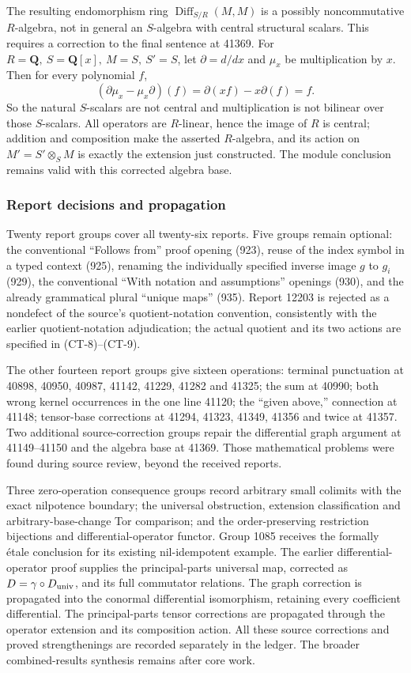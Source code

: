 The resulting endomorphism ring \(\operatorname{Diff}_{S/R}(M,M)\) is a possibly noncommutative \(R\)-algebra, not in general an \(S\)-algebra with central structural scalars. This requires a correction to the final sentence at 41369. For \(R=\mathbf Q,\ S=\mathbf Q[x],\ M=S,\ S'=S\), let \(\partial=d/dx\) and \(\mu_x\) be multiplication by \(x\). Then for every polynomial \(f\), \[
(\partial\mu_x-\mu_x\partial)(f)
 =\partial(xf)-x\partial(f)=f.
\] So the natural \(S\)-scalars are not central and multiplication is not bilinear over those \(S\)-scalars. All operators are \(R\)-linear, hence the image of \(R\) is central; addition and composition make the asserted \(R\)-algebra, and its action on \(M'=S'\otimes_SM\) is exactly the extension just constructed. The module conclusion remains valid with this corrected algebra base.

\subsubsection{Report decisions and propagation}\label{report-decisions-and-propagation}

Twenty report groups cover all twenty-six reports. Five groups remain optional: the conventional ``Follows from'' proof opening (923), reuse of the index symbol in a typed context (925), renaming the individually specified inverse image \(g\) to \(g_i\) (929), the conventional ``With notation and assumptions'' openings (930), and the already grammatical plural ``unique maps'' (935). Report 12203 is rejected as a nondefect of the source's quotient-notation convention, consistently with the earlier quotient-notation adjudication; the actual quotient and its two actions are specified in (CT-8)--(CT-9).

The other fourteen report groups give sixteen operations: terminal punctuation at 40898, 40950, 40987, 41142, 41229, 41282 and 41325; the sum at 40990; both wrong kernel occurrences in the one line 41120; the ``given above,'' connection at 41148; tensor-base corrections at 41294, 41323, 41349, 41356 and twice at 41357. Two additional source-correction groups repair the differential graph argument at 41149--41150 and the algebra base at 41369. Those mathematical problems were found during source review, beyond the received reports.

Three zero-operation consequence groups record arbitrary small colimits with the exact nilpotence boundary; the universal obstruction, extension classification and arbitrary-base-change Tor comparison; and the order-preserving restriction bijections and differential-operator functor. Group 1085 receives the formally étale conclusion for its existing nil-idempotent example. The earlier differential-operator proof supplies the principal-parts universal map, corrected as \(D=\gamma\circ D_{\rm univ}\), and its full commutator relations. The graph correction is propagated into the conormal differential isomorphism, retaining every coefficient differential. The principal-parts tensor corrections are propagated through the operator extension and its composition action. All these source corrections and proved strengthenings are recorded separately in the ledger. The broader combined-results synthesis remains after core work.
